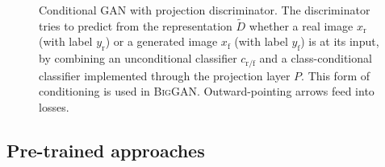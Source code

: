 \documentclass{article}
\newcommand{\cRF}{c_\text{r/f}}
\newcommand{\Dt}{\tilde D}
\newcommand{\biggan}{\textsc{BigGAN}}
\begin{document}
\begin{figure}[t]
\centering
{}
\caption{\label{fig:projdisc}Conditional GAN with projection discriminator. The discriminator tries to predict from the representation $\Dt$ whether a real image $x_\text{r}$ (with label $y_\text{r}$) or a generated image $x_\text{f}$ (with label $y_\text{f}$) is at its input, by combining an unconditional classifier $\cRF$ and a class-conditional classifier implemented through the projection layer $P$. This form of conditioning is used in \biggan{}. Outward-pointing arrows feed into losses. \label{fig:biggan_illustration}}
\end{figure}

\subsection{Pre-trained approaches} \label{sec:transfermethods}
\end{document}
